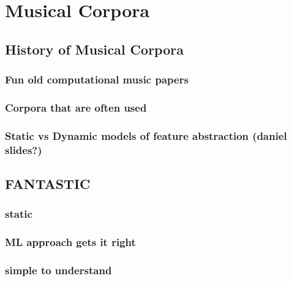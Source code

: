 \documentclass[]{book}
\theoremstyle{definition}
\theoremstyle{definition}
\theoremstyle{definition}
\theoremstyle{remark}
\begin{document}
\hypertarget{musical-corpora}{%
\section{Musical Corpora}\label{musical-corpora}}

\hypertarget{history-of-musical-corpora}{%
\subsection{History of Musical
Corpora}\label{history-of-musical-corpora}}

\hypertarget{fun-old-computational-music-papers}{%
\subsubsection{Fun old computational music
papers}\label{fun-old-computational-music-papers}}

\hypertarget{corpora-that-are-often-used}{%
\subsubsection{Corpora that are often
used}\label{corpora-that-are-often-used}}

\hypertarget{static-vs-dynamic-models-of-feature-abstraction-daniel-slides}{%
\subsubsection{Static vs Dynamic models of feature abstraction (daniel
slides?)}\label{static-vs-dynamic-models-of-feature-abstraction-daniel-slides}}

\hypertarget{fantastic}{%
\subsection{FANTASTIC}\label{fantastic}}

\hypertarget{static}{%
\subsubsection{static}\label{static}}

\hypertarget{ml-approach-gets-it-right}{%
\subsubsection{ML approach gets it
right}\label{ml-approach-gets-it-right}}

\hypertarget{simple-to-understand}{%
\subsubsection{simple to understand}\label{simple-to-understand}}
\end{document}

